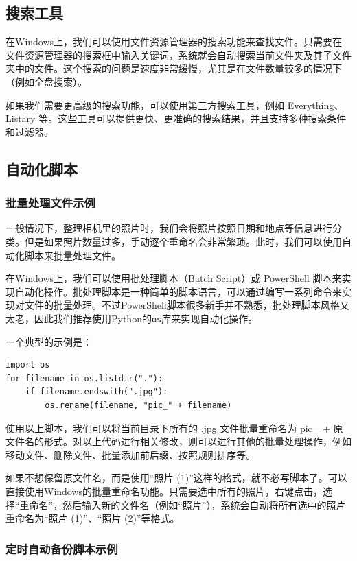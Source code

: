 \documentclass[../main.tex]{subfiles}
\begin{document}
\subsection{搜索工具}

在Windows上，我们可以使用文件资源管理器的搜索功能来查找文件。只需要在文件资源管理器的搜索框中输入关键词，系统就会自动搜索当前文件夹及其子文件夹中的文件。这个搜索的问题是速度非常缓慢，尤其是在文件数量较多的情况下（例如全盘搜索）。

如果我们需要更高级的搜索功能，可以使用第三方搜索工具，例如 Everything、Listary 等。这些工具可以提供更快、更准确的搜索结果，并且支持多种搜索条件和过滤器。

\subsection{自动化脚本}

\subsubsection{批量处理文件示例}

一般情况下，整理相机里的照片时，我们会将照片按照日期和地点等信息进行分类。但是如果照片数量过多，手动逐个重命名会非常繁琐。此时，我们可以使用自动化脚本来批量处理文件。

在Windows上，我们可以使用批处理脚本（Batch Script）或 PowerShell 脚本来实现自动化操作。批处理脚本是一种简单的脚本语言，可以通过编写一系列命令来实现对文件的批量处理。不过PowerShell脚本很多新手并不熟悉，批处理脚本风格又太老，因此我们推荐使用Python的\texttt{os}库来实现自动化操作。

一个典型的示例是：

\begin{verbatim}
import os
for filename in os.listdir("."):  
    if filename.endswith(".jpg"):  
        os.rename(filename, "pic_" + filename)  
\end{verbatim}

使用以上脚本，我们可以将当前目录下所有的 .jpg 文件批量重命名为 pic\_ + 原文件名的形式。对以上代码进行相关修改，则可以进行其他的批量处理操作，例如移动文件、删除文件、批量添加前后缀、按照规则排序等。

如果不想保留原文件名，而是使用“照片 (1)”这样的格式，就不必写脚本了。可以直接使用Windows的批量重命名功能。只需要选中所有的照片，右键点击，选择“重命名”，然后输入新的文件名（例如“照片”），系统会自动将所有选中的照片重命名为“照片 (1)”、“照片 (2)”等格式。

\subsubsection{定时自动备份脚本示例}
\end{document}
